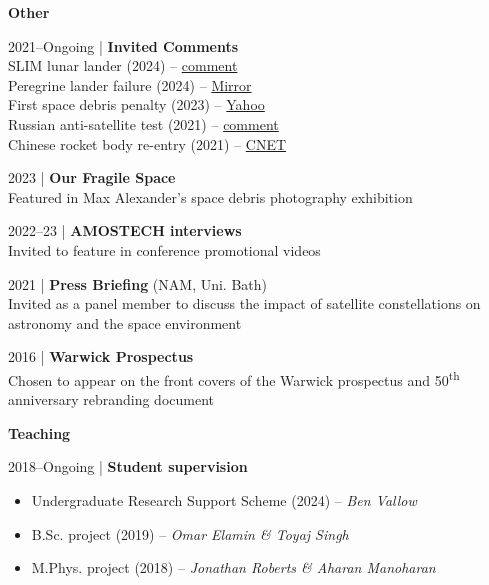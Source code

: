 \documentclass[10pt,a4paper]{altacv}
\begin{document}
\divider

\normalsize \textbf{Other}

\medskip

\small 2021--Ongoing | \textbf{Invited Comments} \\

SLIM lunar lander (2024) -- \href{https://warwick.ac.uk/newsandevents/expertcomment/?newsItem=8a1785d78ce92907018d1d1823594aac}{comment} \\ 
Peregrine lander failure (2024) -- \href{https://www.mirror.co.uk/news/us-news/expert-risks-peregrine-spacecraft-tumbling-31849818}{Mirror} \\
First space debris penalty (2023) -- \href{https://uk.news.yahoo.com/dish-network-us-government-issues-113326233.html}{Yahoo} \\
Russian anti-satellite test (2021) -- \href{https://warwick.ac.uk/newsandevents/expertcomment/russian_anti-satellite_missile}{comment} \\
Chinese rocket body re-entry (2021) -- \href{https://www.cnet.com/science/debris-from-out-of-control-chinese-rocket-crashes-back-to-earth-over-indian-ocean/}{CNET}

\smallskip

\small 2023 | \textbf{Our Fragile Space} \\
Featured in Max Alexander's space debris photography exhibition

\smallskip

\small 2022--23 | \textbf{AMOSTECH interviews} \\
Invited to feature in conference promotional videos

\smallskip

\small 2021 | \textbf{Press Briefing} (NAM, Uni. Bath) \\
Invited as a panel member to discuss the impact of satellite constellations on astronomy and the space environment

\smallskip

\small 2016 | \textbf{Warwick Prospectus} \\
Chosen to appear on the front covers of the Warwick prospectus and 50\textsuperscript{th} anniversary rebranding document

\medskip


\normalsize \textbf{Teaching}

\medskip

\small 2018--Ongoing | \textbf{Student supervision} \\
\smallskip
\begin{itemize}
	\item Undergraduate Research Support Scheme (2024) -- \textit{Ben Vallow}
	\item B.Sc. project (2019) -- \textit{Omar Elamin \& Toyaj Singh}
	\item M.Phys. project (2018) -- \textit{Jonathan Roberts \& Aharan Manoharan}
\end{itemize}
\end{document}
